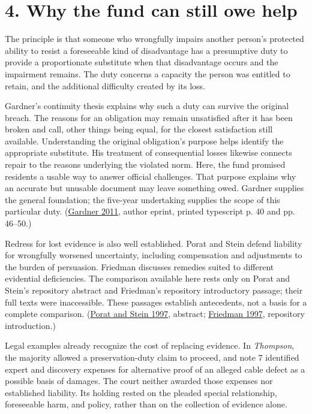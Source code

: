 \section*{4. Why the fund can still owe help}

The principle is that someone who wrongfully impairs another person’s protected ability to resist a foreseeable kind of disadvantage has a presumptive duty to provide a proportionate substitute when that disadvantage occurs and the impairment remains. The duty concerns a capacity the person was entitled to retain, and the additional difficulty created by its loss.

Gardner’s continuity thesis explains why such a duty can survive the original breach. The reasons for an obligation may remain unsatisfied after it has been broken and call, other things being equal, for the closest satisfaction still available. Understanding the original obligation’s purpose helps identify the appropriate substitute. His treatment of consequential losses likewise connects repair to the reasons underlying the violated norm. Here, the fund promised residents a usable way to answer official challenges. That purpose explains why an accurate but unusable document may leave something owed. Gardner supplies the general foundation; the five-year undertaking supplies the scope of this particular duty. (\hyperlink{ref:gardner2011}{Gardner 2011}, author eprint, printed typescript p. 40 and pp. 46–50.)

Redress for lost evidence is also well established. Porat and Stein defend liability for wrongfully worsened uncertainty, including compensation and adjustments to the burden of persuasion. Friedman discusses remedies suited to different evidential deficiencies. The comparison available here rests only on Porat and Stein’s repository abstract and Friedman’s repository introductory passage; their full texts were inaccessible. These passages establish antecedents, not a basis for a complete comparison. (\hyperlink{ref:porat1997}{Porat and Stein 1997}, abstract; \hyperlink{ref:friedman1997}{Friedman 1997}, repository introduction.)

Legal examples already recognize the cost of replacing evidence. In \emph{Thompson}, the majority allowed a preservation-duty claim to proceed, and note 7 identified expert and discovery expenses for alternative proof of an alleged cable defect as a possible basis of damages. The court neither awarded those expenses nor established liability. Its holding rested on the pleaded special relationship, foreseeable harm, and policy, rather than on the collection of evidence alone. 

